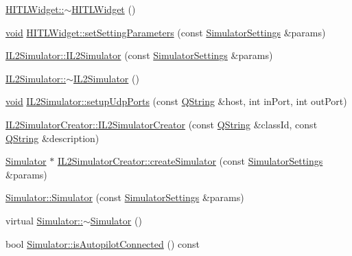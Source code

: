 \begin{DoxyCompactItemize}
\item 
\hyperlink{group___h_i_t_l_plugin_gad53ecce8b7088bb11049d62819ff96f4}{\-H\-I\-T\-L\-Widget\-::$\sim$\-H\-I\-T\-L\-Widget} ()
\item 
\hyperlink{group___u_a_v_objects_plugin_ga444cf2ff3f0ecbe028adce838d373f5c}{void} \hyperlink{group___h_i_t_l_plugin_ga31d53f47fdb03b2ef1c879fa4e55ba53}{\-H\-I\-T\-L\-Widget\-::set\-Setting\-Parameters} (const \hyperlink{group___h_i_t_l_plugin_ga052199f1328d3002bce3e45345aa7f4e}{\-Simulator\-Settings} \&params)
\item 
\hyperlink{group___h_i_t_l_plugin_gae9b990b18a524ff0201db3bbd5608950}{\-I\-L2\-Simulator\-::\-I\-L2\-Simulator} (const \hyperlink{group___h_i_t_l_plugin_ga052199f1328d3002bce3e45345aa7f4e}{\-Simulator\-Settings} \&params)
\item 
\hyperlink{group___h_i_t_l_plugin_gaa5f298fa31201781813a733316fc02e4}{\-I\-L2\-Simulator\-::$\sim$\-I\-L2\-Simulator} ()
\item 
\hyperlink{group___u_a_v_objects_plugin_ga444cf2ff3f0ecbe028adce838d373f5c}{void} \hyperlink{group___h_i_t_l_plugin_ga26c1964cdb6c16877509250d1ba197c7}{\-I\-L2\-Simulator\-::setup\-Udp\-Ports} (const \hyperlink{group___u_a_v_objects_plugin_gab9d252f49c333c94a72f97ce3105a32d}{\-Q\-String} \&host, int in\-Port, int out\-Port)
\item 
\hyperlink{group___h_i_t_l_plugin_ga48d82430e3d3b6b0cc8fb1ed921a5ad0}{\-I\-L2\-Simulator\-Creator\-::\-I\-L2\-Simulator\-Creator} (const \hyperlink{group___u_a_v_objects_plugin_gab9d252f49c333c94a72f97ce3105a32d}{\-Q\-String} \&class\-Id, const \hyperlink{group___u_a_v_objects_plugin_gab9d252f49c333c94a72f97ce3105a32d}{\-Q\-String} \&description)
\item 
\hyperlink{class_simulator}{\-Simulator} $\ast$ \hyperlink{group___h_i_t_l_plugin_gaea21540d2b8699f845b5a6969e5254ba}{\-I\-L2\-Simulator\-Creator\-::create\-Simulator} (const \hyperlink{group___h_i_t_l_plugin_ga052199f1328d3002bce3e45345aa7f4e}{\-Simulator\-Settings} \&params)
\item 
\hyperlink{group___h_i_t_l_plugin_ga8599e13b1f45081a08b7dd1f8c2a988b}{\-Simulator\-::\-Simulator} (const \hyperlink{group___h_i_t_l_plugin_ga052199f1328d3002bce3e45345aa7f4e}{\-Simulator\-Settings} \&params)
\item 
virtual \hyperlink{group___h_i_t_l_plugin_ga0f49aa04f42060a785adf77346b9de9f}{\-Simulator\-::$\sim$\-Simulator} ()
\item 
bool \hyperlink{group___h_i_t_l_plugin_gae38ae2b9870e2eb3888b406ef069b0ac}{\-Simulator\-::is\-Autopilot\-Connected} () const 

\end{DoxyCompactItemize}
